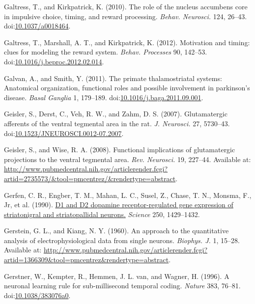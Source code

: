 \documentclass[
  11pt,
  a4paper,
]{scrbook}
\newlength{\cslhangindent}
\newenvironment{CSLReferences}[2] %
 {\begin{list}{}{%
  \setlength{\itemindent}{0pt}
  \setlength{\leftmargin}{0pt}
  \setlength{\parsep}{0pt}
  \ifodd #1
   \setlength{\leftmargin}{\cslhangindent}
   \setlength{\itemindent}{-1\cslhangindent}
  \fi
  \setlength{\itemsep}{#2\baselineskip}}}
 {\end{list}}
\begin{document}
\begin{CSLReferences}{1}{1}
Galtress, T., and Kirkpatrick, K. (2010). {The role of the nucleus
accumbens core in impulsive choice, timing, and reward processing.}
\emph{Behav. Neurosci.} 124, 26--43.
doi:\href{https://doi.org/10.1037/a0018464}{10.1037/a0018464}.

Galtress, T., Marshall, A. T., and Kirkpatrick, K. (2012). {Motivation
and timing: clues for modeling the reward system.} \emph{Behav.
Processes} 90, 142--53.
doi:\href{https://doi.org/10.1016/j.beproc.2012.02.014}{10.1016/j.beproc.2012.02.014}.

Galvan, A., and Smith, Y. (2011). The primate thalamostriatal systems:
Anatomical organization, functional roles and possible involvement in
parkinson's disease. \emph{Basal Ganglia} 1, 179--189.
doi:\href{https://doi.org/10.1016/j.baga.2011.09.001}{10.1016/j.baga.2011.09.001}.

Geisler, S., Derst, C., Veh, R. W., and Zahm, D. S. (2007).
{Glutamatergic afferents of the ventral tegmental area in the rat.}
\emph{J. Neurosci.} 27, 5730--43.
doi:\href{https://doi.org/10.1523/JNEUROSCI.0012-07.2007}{10.1523/JNEUROSCI.0012-07.2007}.

Geisler, S., and Wise, R. A. (2008). {Functional implications of
glutamatergic projections to the ventral tegmental area.} \emph{Rev.
Neurosci.} 19, 227--44. Available at:
\url{http://www.pubmedcentral.nih.gov/articlerender.fcgi?artid=2735573/&tool=pmcentrez/&rendertype=abstract}.

Gerfen, C. R., Engber, T. M., Mahan, L. C., Susel, Z., Chase, T. N.,
Monsma, F., Jr, et al. (1990).
\href{https://www.ncbi.nlm.nih.gov/pubmed/2147780}{D1 and D2 dopamine
receptor-regulated gene expression of striatonigral and striatopallidal
neurons.} \emph{Science} 250, 1429--1432.

Gerstein, G. L., and Kiang, N. Y. (1960). {An approach to the
quantitative analysis of electrophysiological data from single neurons.}
\emph{Biophys. J.} 1, 15--28. Available at:
\url{http://www.pubmedcentral.nih.gov/articlerender.fcgi?artid=1366309&tool=pmcentrez&rendertype=abstract}.

Gerstner, W., Kempter, R., Hemmen, J. L. van, and Wagner, H. (1996). {A
neuronal learning rule for sub-millisecond temporal coding.}
\emph{Nature} 383, 76--81.
doi:\href{https://doi.org/10.1038/383076a0}{10.1038/383076a0}.


\end{CSLReferences}
\end{document}
